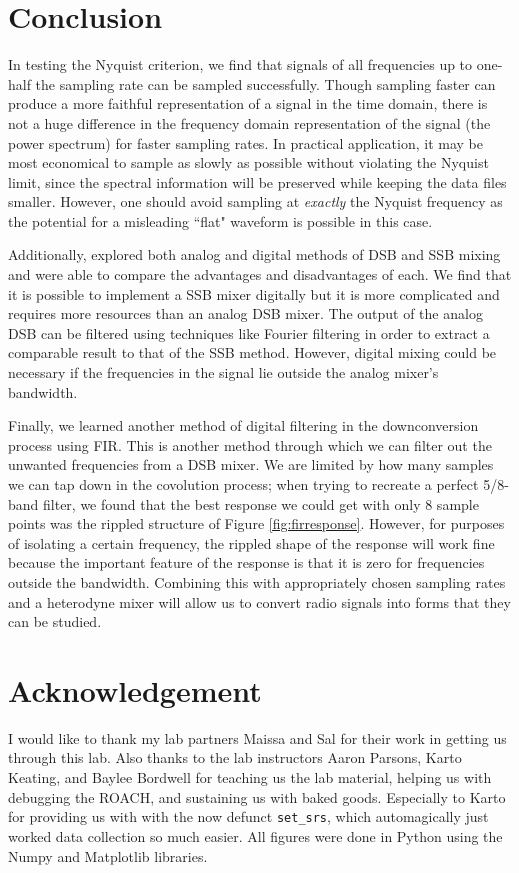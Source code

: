 \documentclass[12pt]{article}
\begin{document}
\section{Conclusion}

In testing the Nyquist criterion, we find that signals of all frequencies up to one-half the sampling rate can be sampled successfully. Though sampling faster can produce a more faithful representation of a signal in the time domain, there is not a huge difference in the frequency domain representation of the signal (the power spectrum) for faster sampling rates. In practical application, it may be most economical to sample as slowly as possible without violating the Nyquist limit, since the spectral information will be preserved while keeping the data files smaller. However, one should avoid sampling at \textit{exactly} the Nyquist frequency as the potential for a misleading ``flat" waveform is possible in this case.

Additionally, explored both analog and digital methods of DSB and SSB mixing and were able to compare the advantages and disadvantages of each. We find that it is possible to implement a SSB mixer digitally but it is more complicated and requires more resources than an analog DSB mixer. The output of the analog DSB can be filtered using techniques like Fourier filtering in order to extract a comparable result to that of the SSB method. However, digital mixing could be necessary if the frequencies in the signal lie outside the analog mixer's bandwidth. 

Finally, we learned another method of digital filtering in the downconversion process using FIR. This is another method through which we can filter out the unwanted frequencies from a DSB mixer. We are limited by how many samples we can tap down in the covolution process; when trying to recreate a perfect 5/8-band filter, we found that the best response we could get with only 8 sample points was the rippled structure of Figure \ref{fig:firresponse}. However, for purposes of isolating a certain frequency, the rippled shape of the response will work fine because the important feature of the response is that it is zero for frequencies outside the bandwidth. Combining this with appropriately chosen sampling rates and a heterodyne mixer will allow us to convert radio signals into forms that they can be studied.

\section{Acknowledgement}
I would like to thank my lab partners Maissa and Sal for their work in getting us through this lab. Also thanks to the lab instructors Aaron Parsons, Karto Keating, and Baylee Bordwell for teaching us the lab material, helping us with debugging the ROACH, and sustaining us with baked goods. Especially to Karto for providing us with with the now defunct \texttt{set\_srs}, which automagically just worked data collection so much easier.
All figures were done in Python using the Numpy and Matplotlib libraries.
\end{document}
